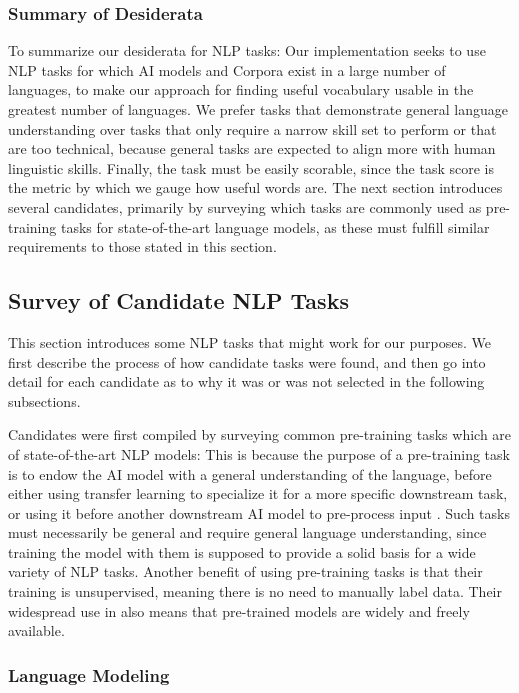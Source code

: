 \subsubsection{Summary of Desiderata}
To summarize our desiderata for NLP tasks:
Our implementation seeks to use NLP tasks for which AI models and Corpora exist in a large number of languages, to make our approach for finding useful vocabulary usable in the greatest number of languages.
We prefer tasks that demonstrate general language understanding over tasks that only require a narrow skill set to perform or that are too technical, because general tasks are expected to align more with human linguistic skills.
Finally, the task must be easily scorable, since the task score is the metric by which we gauge how useful words are.
The next section introduces several candidates, primarily by surveying which tasks are commonly used as pre-training tasks for state-of-the-art language models, as these must fulfill similar requirements to those stated in this section.

\subsection{Survey of Candidate NLP Tasks}
This section introduces some NLP tasks that might work for our purposes.
We first describe the process of how candidate tasks were found, and then go into detail for each candidate as to why it was or was not selected in the following subsections.

Candidates were first compiled by surveying common pre-training tasks which are of state-of-the-art NLP models:
This is because the purpose of a pre-training task is to endow the AI model with a general understanding of the language, before either using transfer learning to specialize it for a more specific downstream task, or using it before another downstream AI model to pre-process input .
Such tasks must necessarily be general and require general language understanding, since training the model with them is supposed to provide a solid basis for a wide variety of NLP tasks.
Another benefit of using pre-training tasks is that their training is unsupervised, meaning there is no need to manually label data.
Their widespread use in \NLP also means that pre-trained models are widely and freely available.

\subsubsection{Language Modeling}

